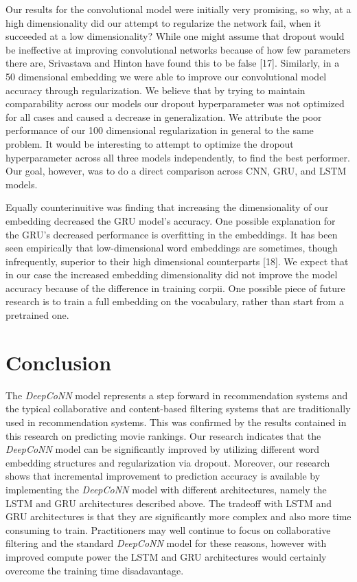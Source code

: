 \documentclass[10pt, twocolumn, letterpaper]{article}
\begin{document}
Our results for the convolutional model were initially very promising, so why, at a high dimensionality did our attempt to regularize the network fail, when it succeeded at a low dimensionality? While one might assume that dropout would be ineffective at improving convolutional networks because of how few parameters there are, Srivastava and Hinton have found this to be false [17]. Similarly, in a 50 dimensional embedding we were able to improve our convolutional model accuracy through regularization. We believe that by trying to maintain comparability across our models our dropout hyperparameter was not optimized for all cases and caused a decrease in generalization. We attribute the poor performance of our 100 dimensional regularization in general to the same problem. It would be interesting to attempt to optimize the dropout hyperparameter across all three models independently, to find the best performer. Our goal, however, was to do a direct comparison across CNN, GRU, and LSTM models.

Equally counterinuitive was finding that increasing the dimensionality of our embedding decreased the GRU model's accuracy. One possible explanation for the GRU's decreased performance is overfitting in the embeddings. It has been seen empirically that low-dimensional word embeddings are sometimes, though infrequently, superior to their high dimensional counterparts [18]. We expect that in our case the increased embedding dimensionality did not improve the model accuracy because of the difference in training corpii. One possible piece of future research is to train a full embedding on the vocabulary, rather than start from a pretrained one.

\section{Conclusion}

The \textit{DeepCoNN} model represents a step forward in recommendation systems and the typical collaborative and content-based filtering systems that are traditionally used in recommendation systems. This was confirmed by the results contained in this research on predicting movie rankings. Our research indicates that the \textit{DeepCoNN} model can be significantly improved by utilizing different word embedding structures and regularization via dropout. Moreover, our research shows that incremental improvement to prediction accuracy is available by implementing the \textit{DeepCoNN} model with different architectures, namely the LSTM and GRU architectures described above. The tradeoff with LSTM and GRU architectures is that they are significantly more complex and also more time consuming to train. Practitioners may well continue to focus on collaborative filtering and the standard \textit{DeepCoNN} model for these reasons, however with improved compute power the LSTM and GRU architectures would certainly overcome the training time disadavantage.
\end{document}
